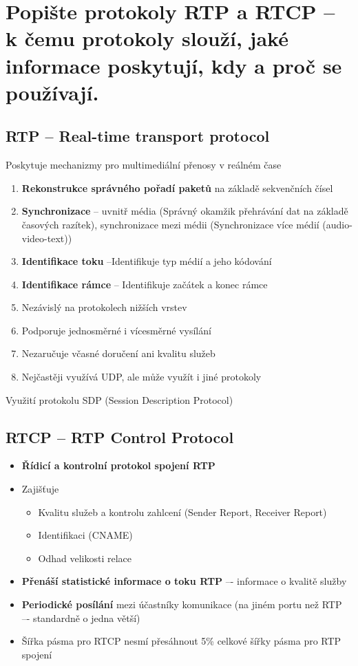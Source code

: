 \newpage
\section{Popište protokoly RTP a RTCP – k čemu protokoly slouží, jaké informace poskytují, kdy a proč se používají.}

\subsection{RTP -- Real-time transport protocol}
Poskytuje mechanizmy pro multimediální přenosy v reálném čase
\begin{enumerate}
    \item \textbf{Rekonstrukce správného pořadí paketů} na základě sekvenčních čísel
    \item \textbf{Synchronizace} --  uvnitř média (Správný okamžik přehrávání dat na základě časových razítek), synchronizace mezi médii (Synchronizace více médií (audio-video-text))
    \item \textbf{Identifikace toku} --Identifikuje typ médií a jeho kódování
    \item \textbf{Identifikace rámce} -- Identifikuje začátek a konec rámce 
    \item Nezávislý na protokolech nižších vrstev
    \item Podporuje jednosměrné i vícesměrné vysílání
    \item Nezaručuje včasné doručení ani kvalitu služeb
    \item Nejčastěji využívá UDP, ale může využít i jiné protokoly
\end{enumerate}
Využití protokolu SDP (Session Description Protocol)


\subsection{RTCP -- RTP Control Protocol}
\begin{itemize}
    \item \textbf{Řídicí a kontrolní protokol spojení RTP} 
    \item Zajišťuje 
    \begin{itemize}
        \item  Kvalitu služeb a kontrolu zahlcení (Sender Report, Receiver Report)
        \item Identifikaci (CNAME)
        \item Odhad velikosti relace
    \end{itemize}
    \item \textbf{Přenáší statistické informace o toku RTP} –- informace o kvalitě služby
    \item \textbf{Periodické posílání} mezi účastníky komunikace (na jiném portu než RTP –- standardně o jedna větší)
    \item Šířka pásma pro RTCP nesmí přesáhnout 5\% celkové šířky pásma pro RTP spojení
\end{itemize}

